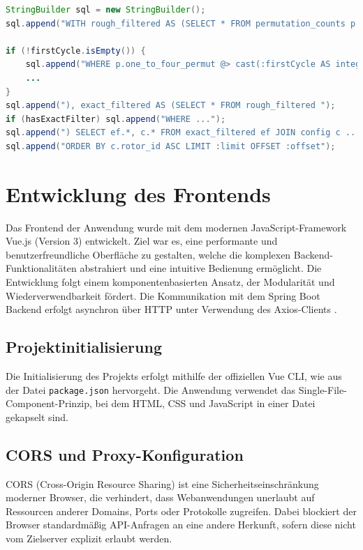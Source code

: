 \documentclass[12pt, ngerman, a4paper, numbers=noenddot]{article}
\begin{document}
\begin{lstlisting}[language=java, caption=Query-Zusammensetzung (Pseudocode), label=lst:query-builder-pseudo]
StringBuilder sql = new StringBuilder();
sql.append("WITH rough_filtered AS (SELECT * FROM permutation_counts p ");

if (!firstCycle.isEmpty()) {
	sql.append("WHERE p.one_to_four_permut @> cast(:firstCycle AS integer[]) ");
	...
}
sql.append("), exact_filtered AS (SELECT * FROM rough_filtered ");
if (hasExactFilter) sql.append("WHERE ...");
sql.append(") SELECT ef.*, c.* FROM exact_filtered ef JOIN config c ...");
sql.append("ORDER BY c.rotor_id ASC LIMIT :limit OFFSET :offset");
\end{lstlisting}




\newpage  
\section{Entwicklung des Frontends}

Das Frontend der Anwendung wurde mit dem modernen JavaScript-Framework Vue.js (Version 3) entwickelt. Ziel war es, eine performante und benutzerfreundliche Oberfläche zu gestalten, welche die komplexen Backend-Funktionalitäten abstrahiert und eine intuitive Bedienung ermöglicht. Die Entwicklung folgt einem komponentenbasierten Ansatz, der Modularität und Wiederverwendbarkeit fördert. Die Kommunikation mit dem Spring Boot Backend erfolgt asynchron über HTTP unter Verwendung des Axios-Clients \cite{enigmaGitHub}.


\subsection{Projektinitialisierung}

Die Initialisierung des Projekts erfolgt mithilfe der offiziellen Vue CLI, wie aus der Datei \lstinline|package.json| hervorgeht. Die Anwendung verwendet das Single-File-Component-Prinzip, bei dem HTML, CSS und JavaScript in einer Datei gekapselt sind.


\subsection{CORS und Proxy-Konfiguration}

CORS (Cross-Origin Resource Sharing) ist eine Sicherheitseinschränkung moderner Browser, die verhindert, dass Webanwendungen unerlaubt auf Ressourcen anderer Domains, Ports oder Protokolle zugreifen. Dabei blockiert der Browser standardmäßig API-Anfragen an eine andere Herkunft, sofern diese nicht vom Zielserver explizit erlaubt werden.
\end{document}
